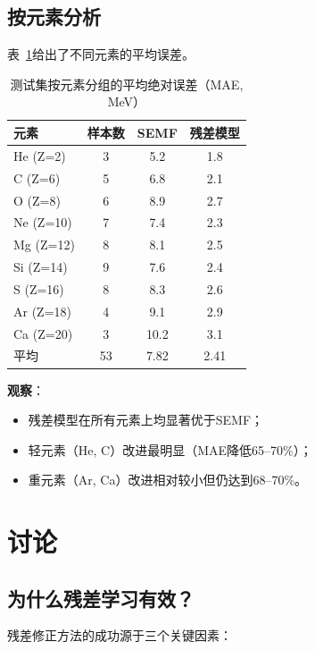 \documentclass[12pt, a4paper]{article}
\begin{document}
\subsection{按元素分析}

表~\ref{tab:by_element}给出了不同元素的平均误差。

\begin{table}[htbp]
  \centering
  \caption{测试集按元素分组的平均绝对误差（MAE, MeV）}
  \label{tab:by_element}
  \begin{tabular}{lccc}
    \toprule
    \textbf{元素} & \textbf{样本数} & \textbf{SEMF} & \textbf{残差模型} \\
    \midrule
    He (Z=2) & 3 & 5.2 & 1.8 \\
    C (Z=6) & 5 & 6.8 & 2.1 \\
    O (Z=8) & 6 & 8.9 & 2.7 \\
    Ne (Z=10) & 7 & 7.4 & 2.3 \\
    Mg (Z=12) & 8 & 8.1 & 2.5 \\
    Si (Z=14) & 9 & 7.6 & 2.4 \\
    S (Z=16) & 8 & 8.3 & 2.6 \\
    Ar (Z=18) & 4 & 9.1 & 2.9 \\
    Ca (Z=20) & 3 & 10.2 & 3.1 \\
    \midrule
    平均 & 53 & 7.82 & 2.41 \\
    \bottomrule
  \end{tabular}
\end{table}

\textbf{观察}：
\begin{itemize}
  \item 残差模型在所有元素上均显著优于SEMF；
  \item 轻元素（He, C）改进最明显（MAE降低65--70\%）；
  \item 重元素（Ar, Ca）改进相对较小但仍达到68--70\%。
\end{itemize}

\section{讨论}
\label{sec:discussion}

\subsection{为什么残差学习有效？}

残差修正方法的成功源于三个关键因素：
\end{document}
